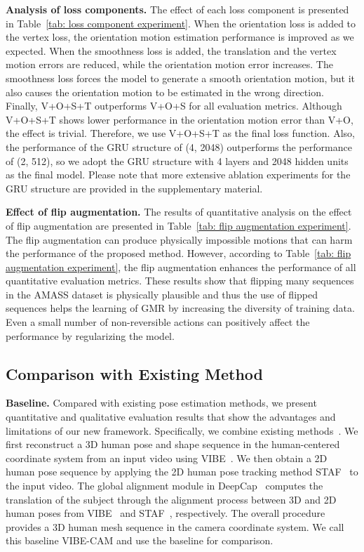 \documentclass[10pt,twocolumn,letterpaper]{article}
\begin{document}
\textbf{Analysis of loss components.} The effect of each loss component is presented in Table~\ref{tab: loss component experiment}. When the orientation loss is added to the vertex loss, the orientation motion estimation performance is improved as we expected. When the smoothness loss is added, the translation and the vertex motion errors are reduced, while the orientation motion error increases. The smoothness loss forces the model to generate a smooth orientation motion, but it also causes the orientation motion to be estimated in the wrong direction. Finally, V+O+S+T outperforms V+O+S for all evaluation metrics. Although V+O+S+T shows lower performance in the orientation motion error than V+O, the effect is trivial. Therefore, we use V+O+S+T as the final loss function. Also, the performance of the GRU structure of (4, 2048) outperforms the performance of (2, 512), so we adopt the GRU structure with 4 layers and 2048 hidden units as the final model. Please note that more extensive ablation experiments for the GRU structure are provided in the supplementary material.




\textbf{Effect of flip augmentation.} The results of quantitative analysis on the effect of flip augmentation are presented in Table~\ref{tab: flip augmentation experiment}. The flip augmentation can produce physically impossible motions that can harm the performance of the proposed method. However, according to Table~\ref{tab: flip augmentation experiment}, the flip augmentation enhances the performance of all quantitative evaluation metrics. These results show that flipping many sequences in the AMASS dataset is physically plausible and thus the use of flipped sequences helps the learning of GMR by increasing the diversity of training data. Even a small number of non-reversible actions can positively affect the performance by regularizing the model.



\subsection{Comparison with Existing Method}
\label{subsection: VIBE-CAM detail}

\textbf{Baseline.} Compared with existing pose estimation methods, we present quantitative and qualitative evaluation results that show the advantages and limitations of our new framework. Specifically, we combine existing methods~\cite{kocabas2020vibe,habermann2020deepcap,raaj2019efficient}. We first reconstruct a 3D human pose and shape sequence in the human-centered coordinate system from an input video using VIBE~\cite{kocabas2020vibe}. We then obtain a 2D human pose sequence by applying the 2D human pose tracking method STAF~\cite{raaj2019efficient} to the input video. The global alignment module in DeepCap~\cite{habermann2020deepcap} computes the translation of the subject through the alignment process between 3D and 2D human poses from VIBE~\cite{kocabas2020vibe} and STAF~\cite{raaj2019efficient}, respectively. The overall procedure provides a 3D human mesh sequence in the camera coordinate system. We call this baseline VIBE-CAM and use the baseline for comparison.
\end{document}
